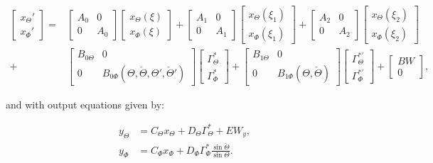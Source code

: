 \documentclass[main.tex]{subfiles}
\begin{document}
\begin{align}
	\begin{bmatrix}
	x_\Theta' \\
	x_\Phi'
	\end{bmatrix} =&
	\begin{bmatrix}
	A_0 & 0 \\
	0 & A_0
	\end{bmatrix}
	\begin{bmatrix}
	x_\Theta(\xi) \\
	x_\Phi(\xi)
	\end{bmatrix} + 
	\begin{bmatrix}
	A_1 & 0 \\
	0 & A_1
	\end{bmatrix}
	\begin{bmatrix}
	x_\Theta(\xi_1) \\
	x_\Phi(\xi_1)
	\end{bmatrix} +
	\begin{bmatrix}
	A_2 & 0 \\
	0 & A_2
	\end{bmatrix}
	\begin{bmatrix}
	x_\Theta(\xi_2) \\
	x_\Phi(\xi_2)
	\end{bmatrix} \nonumber\\
	+&
	\begin{bmatrix}
	B_{0\Theta} & 0\\
	0 & B_{0\Phi}(\Theta,\check{\Theta},\Theta',\check{\Theta}')
	\end{bmatrix} 
	\begin{bmatrix}
	\Gamma_\Theta^* \\
	\Gamma_\Phi^*
	\end{bmatrix} +
	\begin{bmatrix}
	B_{1\Theta} & 0\\
	0 & B_{1\Phi}(\Theta,\check{\Theta})
	\end{bmatrix} 
	\begin{bmatrix}
	\Gamma_\Theta^{*'} \\
	\Gamma_\Phi^{*'}
	\end{bmatrix} + 
	\begin{bmatrix}
	BW \\
	0
	\end{bmatrix},
	\label{eq:systemstatespacerobust}	
\end{align}

and with output equations given by:

	\begin{align}
		y_\Theta &= C_\Theta x_\Theta + D_\Theta \Gamma_\Theta^* + E W_y, \label{eq:output12robust}\\
		y_\Phi &= C_\Phi x_\Phi + D_\Phi \Gamma_\Phi^*	\frac{\sin \check{\Theta}}{\sin \Theta}	.\label{eq:output22robust}	
	\end{align}
\end{document}
